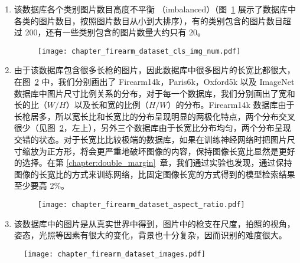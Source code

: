 \begin{enumerate}
\item  该数据库各个类别图片数目高度不平衡 （imbalanced）（图~\ref{fig:dataset_cls_img_num} 展示了数据库中各类的图片数目，按照图片数目从小到大排序），有的类别包含的图片数目超过 200，还有一些类别包含的图片数量大约只有 20。

\begin{figure}[t!]
	\centering
	\texttt{[image: chapter\_firearm\_dataset\_cls\_img\_num.pdf]}
	\label{fig:dataset_cls_img_num}
\end{figure}

\item  由于该数据库包含很多长枪的图片，因此数据库中很多图片的长宽比都很大，在图~\ref{fig:dataset_aspect_ratio} 中，我们分别画出了 Firearm14k，Paris6k，Oxford5k 以及 ImageNet 数据库中图片尺寸比例关系的分布，对于每一个数据库，我们分别画出了宽和长的比（$W/H$）以及长和宽的比例（$H/W$）的分布。Firearm14k 数据库由于长枪居多，所以宽长比和长宽比的分布呈现明显的两极化特点，两个分布交叉很少（见图~\ref{fig:dataset_aspect_ratio}，左上），另外三个数据库由于长宽比分布均匀，两个分布呈现交错的状态。对于长宽比比较极端的数据库，如果在训练神经网络时把图片尺寸缩放为正方形，将会更严重地破坏图像的内容，保持图像长宽比显然是更好的选择。在第 \ref{chapter:double_margin}~章，我们通过实验也发现，通过保持图像的长宽比的方式来训练网络，比固定图像长宽的方式得到的模型检索结果至少要高 2\%。

\begin{figure}[t!]
	\centering
	\texttt{[image: chapter\_firearm\_dataset\_aspect\_ratio.pdf]}
	\label{fig:dataset_aspect_ratio}
\end{figure}

\item 该数据库中的图片是从真实世界中得到，图片中的枪支在尺度，拍照的视角，姿态，光照等因素有很大的变化，背景也十分复杂，因而识别的难度很大。
\end{enumerate}

\begin{figure}[!t]
	\centering
	\texttt{[image: chapter\_firearm\_dataset\_images.pdf]}
	\label{fig:dataset_sample_images}
\end{figure}


